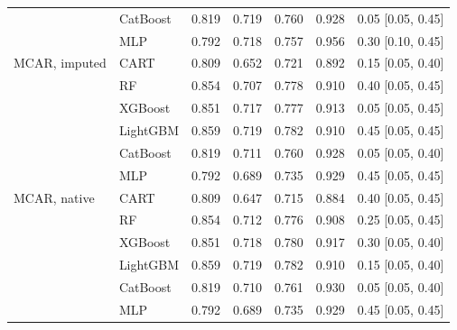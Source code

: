 \begin{table}[p]
\begin{tabular}{@{}llrrrrl@{}}
 & CatBoost & 0.819 & 0.719 & 0.760 & 0.928 & 0.05 [0.05, 0.45] \\
 & MLP & 0.792 & 0.718 & 0.757 & 0.956 & 0.30 [0.10, 0.45] \\
\midrule
MCAR, imputed & CART & 0.809 & 0.652 & 0.721 & 0.892 & 0.15 [0.05, 0.40] \\
 & RF & 0.854 & 0.707 & 0.778 & 0.910 & 0.40 [0.05, 0.45] \\
 & XGBoost & 0.851 & 0.717 & 0.777 & 0.913 & 0.05 [0.05, 0.45] \\
 & LightGBM & 0.859 & 0.719 & 0.782 & 0.910 & 0.45 [0.05, 0.45] \\
 & CatBoost & 0.819 & 0.711 & 0.760 & 0.928 & 0.05 [0.05, 0.40] \\
 & MLP & 0.792 & 0.689 & 0.735 & 0.929 & 0.45 [0.05, 0.45] \\
\midrule
MCAR, native & CART & 0.809 & 0.647 & 0.715 & 0.884 & 0.40 [0.05, 0.45] \\
 & RF & 0.854 & 0.712 & 0.776 & 0.908 & 0.25 [0.05, 0.45] \\
 & XGBoost & 0.851 & 0.718 & 0.780 & 0.917 & 0.30 [0.05, 0.40] \\
 & LightGBM & 0.859 & 0.719 & 0.782 & 0.910 & 0.15 [0.05, 0.40] \\
 & CatBoost & 0.819 & 0.710 & 0.761 & 0.930 & 0.05 [0.05, 0.40] \\
 & MLP & 0.792 & 0.689 & 0.735 & 0.929 & 0.45 [0.05, 0.45] \\
\bottomrule
\end{tabular}
\end{table}

